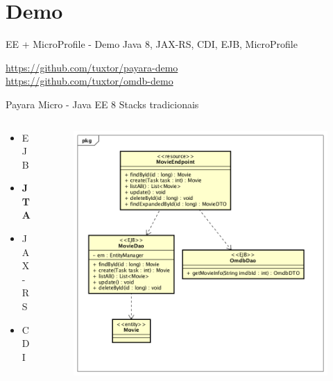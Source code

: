 \documentclass{beamer}
\begin{document}
\section{Demo}
\begin{frame}{EE + MicroProfile  - Demo}
\huge Java 8, JAX-RS, CDI, EJB, MicroProfile

\normalsize  \url{https://github.com/tuxtor/payara-demo}\\
\normalsize  \url{https://github.com/tuxtor/omdb-demo}
\end{frame}

\begin{frame}{Payara Micro - Java EE 8}
Stacks tradicionais
\begin{columns}[T] %
\begin{column}[T]{3cm} %
	\begin{itemize}
		\item EJB
		\item \textbf{JTA}
		\item JAX-RS
		\item CDI
	\end{itemize}
\end{column}
\begin{column}[T]{7cm} %
	\begin{figure}
		\centering
		\includegraphics[width=\linewidth]{Images/democlass}
	\end{figure}
\end{column}
\end{columns}
\end{frame}
\end{document}
